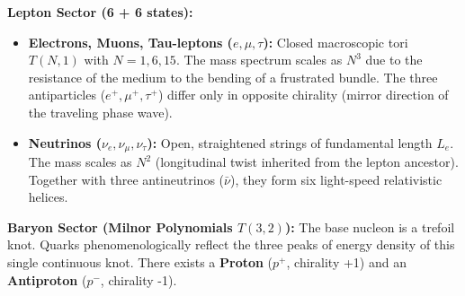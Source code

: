 \documentclass[11pt,a4paper]{article}
\begin{document}
	\textbf{Lepton Sector (6 + 6 states):}
	\begin{itemize}
		\item \textbf{Electrons, Muons, Tau-leptons ($e, \mu, \tau$):} Closed macroscopic tori $T(N,1)$ with $N = 1, 6, 15$. The mass spectrum scales as $N^3$ due to the resistance of the medium to the bending of a frustrated bundle. The three antiparticles ($e^+, \mu^+, \tau^+$) differ only in opposite chirality (mirror direction of the traveling phase wave).
		\item \textbf{Neutrinos ($\nu_e, \nu_\mu, \nu_\tau$):} Open, straightened strings of fundamental length $L_e$. The mass scales as $N^2$ (longitudinal twist inherited from the lepton ancestor). Together with three antineutrinos ($\bar{\nu}$), they form six light-speed relativistic helices.
	\end{itemize}
	
	\textbf{Baryon Sector (Milnor Polynomials $T(3,2)$):}
	The base nucleon is a trefoil knot. Quarks phenomenologically reflect the three peaks of energy density of this single continuous knot. There exists a \textbf{Proton} ($p^+$, chirality +1) and an \textbf{Antiproton} ($p^-$, chirality -1).
	
\end{document}
